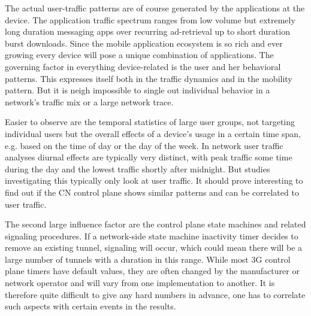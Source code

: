 The actual user-traffic patterns are of course generated by the applications at the device. The application traffic spectrum ranges from low volume but extremely long duration messaging apps over recurring ad-retrieval up to short duration burst downloads. Since the mobile application ecosystem is so rich and ever growing every device will pose a unique combination of applications. The governing factor in everything device-related is the user and her behavioral patterns. This expresses itself both in the traffic dynamics and in the mobility pattern. But it is neigh impossible to single out individual behavior in a network's traffic mix or a large network trace.

Easier to observe are the temporal statistics of large user groups, not targeting individual users but the overall effects of a device's usage in a certain time span, e.g. based on the time of day or the day of the week. In network user traffic analyses diurnal effects are typically very distinct, with peak traffic some time during the day and the lowest traffic shortly after midnight. But studies investigating this typically only look at user traffic. It should prove interesting to find out if the \gls{CN} control plane shows similar patterns and can be correlated to user traffic.

The second large influence factor are the control plane state machines and related signaling procedures. If a network-side state machine inactivity timer decides to remove an existing tunnel, signaling will occur, which could mean there will be a large number of tunnels with a duration in this range. While most \gls{3G} control plane timers have default values, they are often changed by the manufacturer or network operator and will vary from one implementation to another. It is therefore quite difficult to give any hard numbers in advance, one has to correlate such aspects with certain events in the results.


